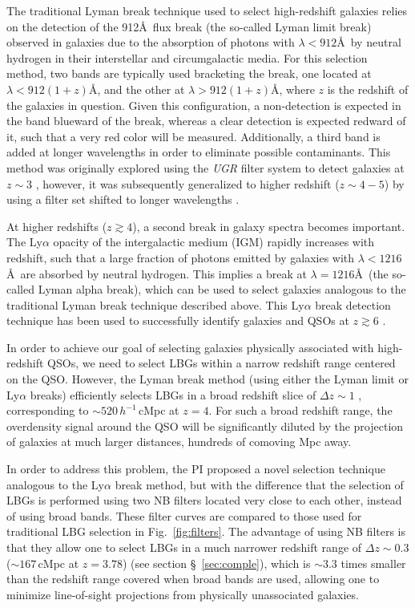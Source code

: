 \documentclass[iop, revtex4]{emulateapj}
\begin{document}
The traditional Lyman break technique used to select high-redshift
galaxies relies on the detection of the 912\AA\, flux break (the
so-called Lyman limit break) observed in galaxies due to the
absorption of photons with $\lambda<912$\AA\, by neutral hydrogen
in their interstellar and circumgalactic media.  For this selection method,
two bands are typically used bracketing the break, 
one located at $\lambda<912(1+z)$\AA, and the other at 
$\lambda>912(1+z)$\AA, where $z$ is the redshift of the galaxies
in question.  Given this configuration, a non-detection is expected
in the band blueward of the break, whereas
a clear detection is expected redward of it, such that a very red color
will be measured.  Additionally, a third band is added at longer wavelengths in
order to eliminate possible contaminants. This method was originally
explored using the \textit{UGR} filter system to detect galaxies at
$z\sim3$ \citep{Steidel95, Steidel96, Steidel03}, however, it was
subsequently generalized to higher redshift ($z\sim4-5$) by using a
filter set shifted to longer wavelengths \citep{Steidel99, Ouchi04a}.

At higher redshifts ($z\gtrsim4$), a second break in galaxy spectra
becomes important. The Ly$\alpha$ opacity of the intergalactic medium
(IGM) rapidly increases with redshift, such that a large fraction of
photons emitted by galaxies with $\lambda<1216$\AA\ are absorbed by
neutral hydrogen. This implies a break at $\lambda=1216$\AA\, (the
so-called Lyman alpha break), which can be used to select galaxies
analogous to the traditional Lyman break technique described
above. This Ly$\alpha$ break detection technique has been used to
successfully identify galaxies and QSOs at $z\gtrsim 6$
\citep{Fan00, Bouwens07, Bouwens10, Oesch10, Banados16}.

In order to achieve our goal of selecting galaxies physically
associated with high-redshift QSOs, we need to select LBGs within a narrow
redshift range centered on the QSO. However, the Lyman break method
(using either the Lyman limit or Ly$\alpha$ breaks) efficiently
selects LBGs in a broad redshift slice of $\Delta z\sim1$
\citep[e.g.][]{Ouchi04a, Bouwens07, Bouwens10}, corresponding to 
$\sim520\,h^{-1}$\,cMpc at $z=4$.
For such a broad redshift range, the overdensity
signal around the QSO will be significantly diluted by the
projection of galaxies at much larger distances, hundreds
of comoving Mpc away. 

In order to address this problem, the PI proposed a novel selection
technique analogous to the Ly$\alpha$ break method, but with the
difference that the selection of LBGs is performed using two NB
filters located very close to each other, instead of using broad
bands.  These filter curves are compared to those used for traditional
LBG selection in Fig.~\ref{fig:filters}.  The advantage of using NB
filters is that they allow one to select LBGs in a much narrower
redshift range of $\Delta z\sim0.3$ ($\sim167$\,cMpc at $z=3.78$) (see
section \S~\ref{sec:comple}), which is $\sim3.3$ times smaller than
the redshift range covered when broad bands are used,
allowing one to minimize line-of-sight projections from physically unassociated
galaxies.
\end{document}

